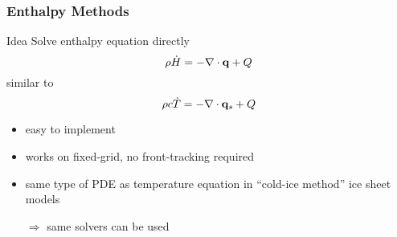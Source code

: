\documentclass[hide notes,intlimits]{beamer}
\begin{document}
\begin{frame}
  \frametitle{Enthalpy Methods}
  \begin{block}{Idea}
    Solve enthalpy equation directly
    \begin{equation*}
      \rho \dot H = - \nabla \cdot {\bf q} + Q
    \end{equation*}
    similar to
    \begin{equation*}
      \rho c \dot T = - \nabla \cdot {\bf q}_{s} + Q
    \end{equation*}
    \begin{itemize}
    \item easy to implement
    \item works on fixed-grid, no front-tracking required
    \item same type of PDE as temperature equation in ``cold-ice method'' ice sheet models
    \item[$\Rightarrow$] same solvers can be used
    \end{itemize}
  \end{block}	
\end{frame}
\end{document}
